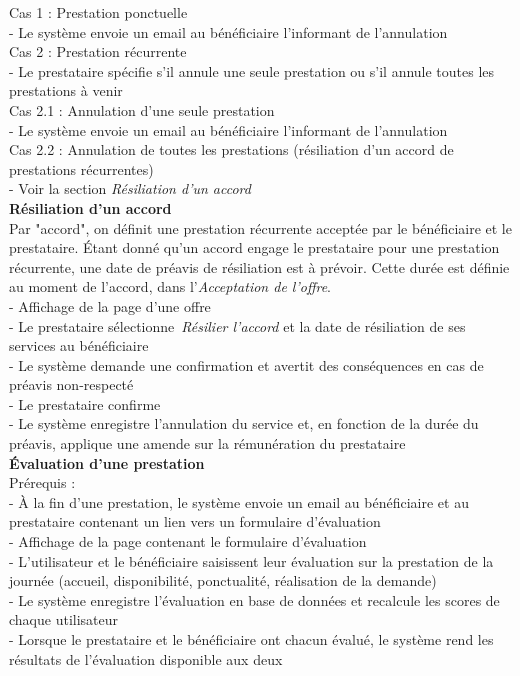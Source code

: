 \documentclass[conference]{IEEEtran}
\begin{document}
Cas 1 : Prestation ponctuelle\\
- Le système envoie un email au bénéficiaire l'informant de l'annulation\\

Cas 2 : Prestation récurrente\\
- Le prestataire spécifie s'il annule une seule prestation ou s'il annule toutes les prestations à venir\\

Cas 2.1 : Annulation d'une seule prestation\\
- Le système envoie un email au bénéficiaire l'informant de l'annulation\\

Cas 2.2 : Annulation de toutes les prestations (résiliation d'un accord de prestations récurrentes)\\
- Voir la section \textit{Résiliation d'un accord}\\

\textbf{Résiliation d'un accord}\hfil\\
Par "accord", on définit une prestation récurrente acceptée par le bénéficiaire et le prestataire. Étant donné qu'un accord engage le prestataire pour une prestation récurrente, une date de préavis de résiliation est à prévoir. Cette durée est définie au moment de l'accord, dans l'\textit{Acceptation de l'offre}.\\

- Affichage de la page d'une offre\\
- Le prestataire sélectionne \textit{Résilier l'accord} et la date de résiliation de ses services au bénéficiaire\\
- Le système demande une confirmation et avertit des conséquences en cas de préavis non-respecté\\
- Le prestataire confirme\\
- Le système enregistre l'annulation du service et, en fonction de la durée du préavis, applique une amende sur la rémunération du prestataire\\

\textbf{Évaluation d'une prestation}\hfil\\
Prérequis :\\
- À la fin d'une prestation, le système envoie un email au bénéficiaire et au prestataire contenant un lien vers un formulaire d'évaluation\\

- Affichage de la page contenant le formulaire d'évaluation\\
- L'utilisateur et le bénéficiaire saisissent leur évaluation sur la prestation de la journée (accueil, disponibilité, ponctualité, réalisation de la demande)\\
- Le système enregistre l'évaluation en base de données et recalcule les scores de chaque utilisateur\\
- Lorsque le prestataire et le bénéficiaire ont chacun évalué, le système rend les résultats de l'évaluation disponible aux deux\\
\end{document}
